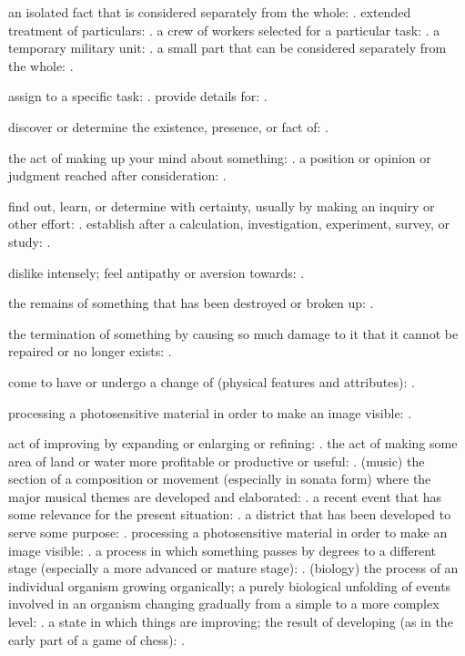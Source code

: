   an isolated fact that is considered separately from the whole: . extended treatment of particulars: . a crew of workers selected for a particular task: . a temporary military unit: . a small part that can be considered separately from the whole: .

  assign to a specific task: . provide details for: .

  discover or determine the existence, presence, or fact of: .

  the act of making up your mind about something: . a position or opinion or judgment reached after consideration: .

  find out, learn, or determine with certainty, usually by making an inquiry or other effort: . establish after a calculation, investigation, experiment, survey, or study: .

  dislike intensely; feel antipathy or aversion towards: .

  the remains of something that has been destroyed or broken up: .

  the termination of something by causing so much damage to it that it cannot be repaired or no longer exists: .

  come to have or undergo a change of (physical features and attributes): .

  processing a photosensitive material in order to make an image visible: .

  act of improving by expanding or enlarging or refining: . the act of making some area of land or water more profitable or productive or useful: . (music) the section of a composition or movement (especially in sonata form) where the major musical themes are developed and elaborated: . a recent event that has some relevance for the present situation: . a district that has been developed to serve some purpose: . processing a photosensitive material in order to make an image visible: . a process in which something passes by degrees to a different stage (especially a more advanced or mature stage): . (biology) the process of an individual organism growing organically; a purely biological unfolding of events involved in an organism changing gradually from a simple to a more complex level: . a state in which things are improving; the result of developing (as in the early part of a game of chess): .

